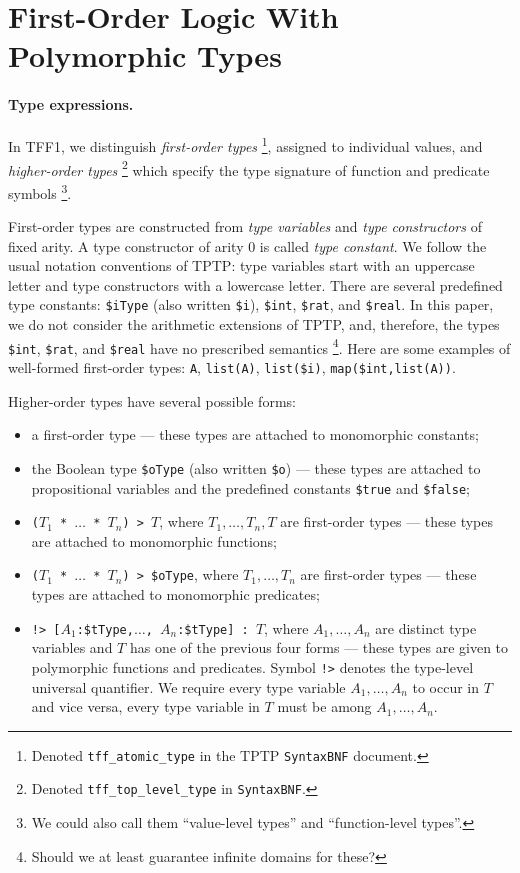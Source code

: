 \section{First-Order Logic With Polymorphic Types} \label{sec_logic}

\paragraph{Type expressions.} In TFF1, we distinguish
{\em first-order types}%
\footnote{Denoted {\tt tff\_atomic\_type} in the
TPTP {\tt SyntaxBNF} document.}, assigned to individual values,
and {\em higher-order types}%
\footnote{Denoted {\tt tff\_top\_level\_type} in {\tt SyntaxBNF}.}
which specify the type signature of function and predicate symbols%
\footnote{We could also call them ``value-level types'' and
``function-level types''.}.

First-order types are constructed from {\em type variables\/}
and {\em type constructors\/} of fixed arity. A type constructor
of arity 0 is called {\em type constant}. We follow the usual
notation conventions of TPTP: type variables start with an
uppercase letter and type constructors with a lowercase letter.
There are several predefined type constants:
\verb+$iType+ (also written \verb+$i+),
\verb+$int+, \verb+$rat+, and \verb+$real+. In this paper,
we do not consider the arithmetic extensions of TPTP, and,
therefore, the types \verb+$int+, \verb+$rat+, and \verb+$real+
have no prescribed semantics%
\footnote{Should we at least guarantee infinite domains for these?}.
Here are some examples of well-formed first-order types:
\verb+A+, \verb+list(A)+, \verb+list($i)+, \verb+map($int,list(A))+.

Higher-order types have several possible forms:
\begin{itemize}
\item a first-order type --- these types are attached to
monomorphic constants;
\item the Boolean type \verb+$oType+ (also written \verb+$o+)
--- these types are attached to propositional variables and
the predefined constants \verb+$true+ and \verb+$false+;
\item {\tt ($T_1$ * $\dots$ * $T_n$) > $T$},
where $T_1,\dots,T_n,T$ are first-order types ---
these types are attached to monomorphic functions;
\item {\tt ($T_1$ * $\dots$ * $T_n$) > \$oType},
where $T_1,\dots,T_n$ are first-order types --- these types
are attached to monomorphic predicates;
\item {\tt !>~[$A_1$:\$tType,$\dots$,%
$A_n$:\$tType]~:~$T$}, where $A_1,\dots,A_n$ are distinct
type variables and $T$ has one of the previous four forms ---
these types are given to polymorphic functions and predicates.
Symbol {\tt !>} denotes the type-level universal quantifier.
We require every type variable $A_1,\dots,A_n$ to occur
in $T$ and vice versa, every type variable in $T$ must be
among $A_1,\dots,A_n$.
\end{itemize}

